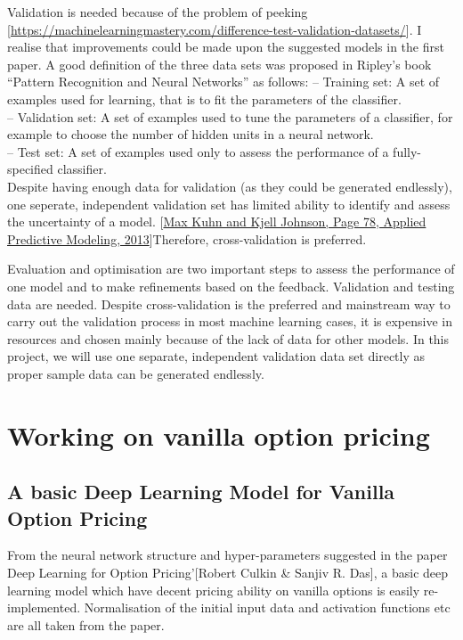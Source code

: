 \documentclass{report}
\begin{document}
Validation is needed because of the problem of peeking [\url{https://machinelearningmastery.com/difference-test-validation-datasets/}]. I realise that improvements could be made upon the suggested models in the first paper. 
A good definition of the three data sets was proposed in Ripley’s book “Pattern Recognition and Neural Networks” as follows:
– Training set: A set of examples used for learning, that is to fit the parameters of the classifier.\\
– Validation set: A set of examples used to tune the parameters of a classifier, for example to choose the number of hidden units in a neural network.\\
– Test set: A set of examples used only to assess the performance of a fully-specified classifier.\\
Despite having enough data for validation (as they could be generated endlessly), one seperate, independent validation set has limited ability to identify and assess the uncertainty of a model. [\url{Max Kuhn and Kjell Johnson, Page 78, Applied Predictive Modeling, 2013}]Therefore, cross-validation is preferred.

Evaluation and optimisation are two important steps to assess the performance of one model and to make refinements based on the feedback. Validation and testing data are needed. 
Despite cross-validation is the preferred and mainstream way to carry out the validation process in most machine learning cases, it is expensive in resources and chosen mainly because of the lack of data for other models. In this project, we will use one separate, independent validation data set directly as proper sample data can be generated endlessly. 


\chapter{Working on vanilla option pricing}

\section{A basic Deep Learning Model for Vanilla Option Pricing}
From the neural network structure and hyper-parameters suggested in the paper Deep Learning for Option Pricing’[Robert Culkin & Sanjiv R. Das], a basic deep learning model which have decent pricing ability on vanilla options is easily re-implemented. Normalisation of the initial input data and activation functions etc are all taken from the paper. 
\end{document}
